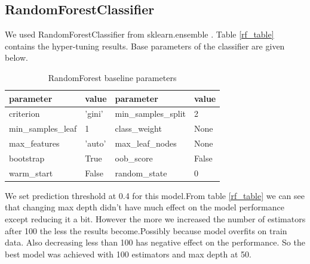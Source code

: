 \documentclass[14pt, conference]{IEEEtran}
\begin{document}
\subsection{RandomForestClassifier}
We used RandomForestClassifier from sklearn.ensemble . Table \ref{rf_table} contains the hyper-tuning results. Base parameters of the classifier are given below.

\begin{table}[H]
\normalsize

\centering
\caption{RandomForest baseline parameters}
\label{rf_base_parameters}
\renewcommand{\arraystretch}{1.2}

\begin{tabular}{|C{2.6cm}|C{1cm}|C{2.7cm}|C{1cm}|}
\hline
\textbf{parameter} & \textbf{value} & \textbf{parameter} & \textbf{value} \\ \hline
criterion & ’gini’ &  min\_samples\_split  & 2   \\ \hline
min\_samples\_leaf & 1 & class\_weight & None  \\ \hline
max\_features & ’auto’& max\_leaf\_nodes & None  \\ \hline
bootstrap & True & oob\_score & False  \\ \hline
warm\_start & False & random\_state & 0  \\ \hline
\end{tabular}
\end{table}



We set prediction threshold at 0.4 for this model.From table \ref{rf_table} we can see that changing max depth didn't have much effect on the model performance except reducing it a bit. However the more we increased the number of estimators after 100 the less the results become.Possibly because model overfits on train data. Also decreasing less than 100 has negative effect on the performance. So the best model was achieved with 100 estimators and max depth at 50.
\end{document}
